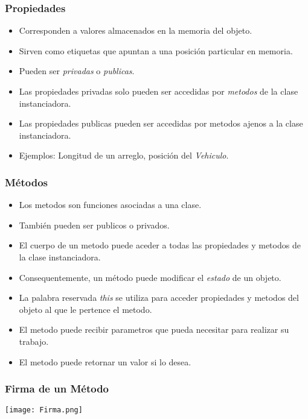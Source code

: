 \documentclass{beamer}
\begin{document}
\begin{frame}
\frametitle{Propiedades}
\begin{itemize}
    \item Corresponden a valores almacenados en la memoria del objeto.
    \item Sirven como etiquetas que apuntan a una posici\'on particular en memoria.
    \item Pueden ser \emph{privadas} o \emph{publicas}.
    \item Las propiedades privadas solo pueden ser accedidas por \emph{metodos} de la clase instanciadora.
    \item Las propiedades publicas pueden ser accedidas por metodos ajenos a la clase instanciadora.
    \item Ejemplos: Longitud de un arreglo, posici\'on del \emph{Vehiculo}.
\end{itemize}
\end{frame}

\begin{frame}
\frametitle{M\'etodos}
\begin{itemize}
    \item Los metodos son funciones asociadas a una clase.
    \item Tambi\'en pueden ser publicos o privados.
    \item El cuerpo de un metodo puede aceder a todas las propiedades y metodos de la clase instanciadora.
    \item Consequentemente, un m\'etodo puede modificar el \emph{estado} de un objeto.
    \item La palabra reservada \emph{this} se utiliza para acceder propiedades y metodos del objeto al que le pertence el metodo.
    \item El metodo puede recibir parametros que pueda necesitar para realizar su trabajo.
    \item El metodo puede retornar un valor si lo desea.
\end{itemize}
\end{frame}

\begin{frame}
\frametitle{Firma de un M\'etodo}
\texttt{[image: Firma.png]}
\end{frame}
\end{document}
